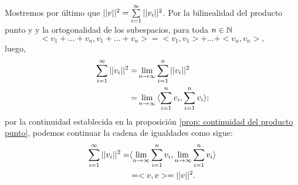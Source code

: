 \begin{itemize}
Mostremos por último que $|| v ||^{2} = \sum\limits_{i=1}^{\infty}|| v_{i} ||^{2} $.
Por la bilinealidad del producto punto y
y la ortogonalidad de los subespacios, para toda $n \in \mathbb{N}$
\[
< v_{1}+ \ldots + v_{n} , v_{1}+ \ldots + v_{n}  > =
< v_{1} , v_{1} > + \ldots + < v_{n} , v_{n} >,
\]
luego,
\begin{align*}
\sum\limits_{i=1}^{\infty}||v_{i}||^{2} = &
\lim\limits_{n \rightarrow \infty}{\sum\limits_{i=1}^{n}||v_{i}||^{2}} \\
= & \lim\limits_{n \rightarrow \infty}{\langle 
\sum\limits_{i=1}^{n}v_{i} , \sum\limits_{i=1}^{n}v_{i} \rangle };
\end{align*}
por la continuidad establecida en la 
proposición \ref{prop: continuidad del producto punto},
podemos continuar la cadena de igualdades como sigue:
\begin{align*}
\sum\limits_{i=1}^{\infty}||v_{i}||^{2} = & \langle  \lim\limits_{n \rightarrow \infty}{\sum\limits_{i=1}^{n}v_{i}} ,
 \lim\limits_{n \rightarrow \infty}{\sum\limits_{i=1}^{n}v_{i}} \rangle \\
 & = < v , v > = ||v||^{2}.
\end{align*}
\end{itemize}
\QEDB
\vspace{0.2cm}

